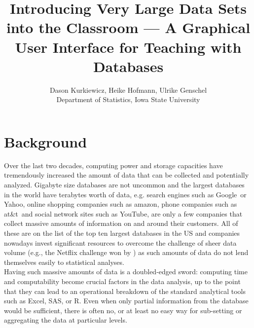 \documentclass[11pt]{tise_style}
\author{Dason Kurkiewicz, Heike Hofmann, Ulrike Genschel\\Department of Statistics, Iowa State University}
\title{Introducing Very Large Data Sets into the Classroom --- A Graphical User Interface for Teaching with Databases}
\begin{document}
\section{{Background}}
Over the last two decades, computing power and storage capacities have tremendously
increased the amount of data that can be collected and potentially analyzed. Gigabyte size databases are not uncommon and the largest databases in the world have terabytes worth of data, e.g.  search engines such as Google\texttrademark\  or  Yahoo\texttrademark, online shopping companies such as amazon\texttrademark, phone companies such as  at\&t\texttrademark\ and social network sites such as YouTube\texttrademark, are only a few companies that collect massive amounts of information on and around their customers. All of these are on the list of the top ten largest databases in the US \citep{topten} and companies nowadays invest significant resources to overcome the challenge of sheer data volume (e.g., the Netflix challenge won by \citet{netflix:2009})  as such amounts of data do not lend themselves easily to statistical analyses. \\
Having such massive amounts of data is a doubled-edged sword: computing time and computability become crucial factors in the data analysis, up to the point that they can lead to an operational breakdown of the standard analytical tools such as Excel, SAS, or R. Even when only partial information from the database would be sufficient, there is often no, or at least no easy way for sub-setting or aggregating the data at particular levels.
\end{document}
